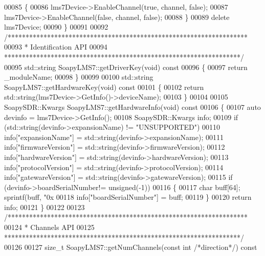 \begin{DoxyCode}
{{{{00085     \{
00086         lms7Device->EnableChannel(\textcolor{keyword}{true}, channel, \textcolor{keyword}{false});   
00087         lms7Device->EnableChannel(\textcolor{keyword}{false}, channel, \textcolor{keyword}{false});
00088     \}
00089     \textcolor{keyword}{delete} lms7Device;
00090 \}
00091 
00092 \textcolor{comment}{/*******************************************************************}
00093 \textcolor{comment}{ * Identification API}
00094 \textcolor{comment}{ ******************************************************************/}
00095 std::string SoapyLMS7::getDriverKey(\textcolor{keywordtype}{void})\textcolor{keyword}{ const}
00096 \textcolor{keyword}{}\{
00097     \textcolor{keywordflow}{return} _moduleName;
00098 \}
00099 
00100 std::string SoapyLMS7::getHardwareKey(\textcolor{keywordtype}{void})\textcolor{keyword}{ const}
00101 \textcolor{keyword}{}\{
00102     \textcolor{keywordflow}{return} std::string(lms7Device->GetInfo()->deviceName);
00103 \}
00104 
00105 SoapySDR::Kwargs SoapyLMS7::getHardwareInfo(\textcolor{keywordtype}{void})\textcolor{keyword}{ const}
00106 \textcolor{keyword}{}\{
00107     \textcolor{keyword}{auto} devinfo = lms7Device->GetInfo();
00108     SoapySDR::Kwargs info;
00109     \textcolor{keywordflow}{if} (std::string(devinfo->expansionName) != \textcolor{stringliteral}{"UNSUPPORTED"})
00110         info[\textcolor{stringliteral}{"expansionName"}] = std::string(devinfo->expansionName);
00111     info[\textcolor{stringliteral}{"firmwareVersion"}] = std::string(devinfo->firmwareVersion);
00112     info[\textcolor{stringliteral}{"hardwareVersion"}] = std::string(devinfo->hardwareVersion);
00113     info[\textcolor{stringliteral}{"protocolVersion"}] = std::string(devinfo->protocolVersion);
00114     info[\textcolor{stringliteral}{"gatewareVersion"}] = std::string(devinfo->gatewareVersion);
00115     \textcolor{keywordflow}{if} (devinfo->boardSerialNumber!= \textcolor{keywordtype}{unsigned}(-1))
00116     \{
00117         \textcolor{keywordtype}{char} buff[64]; sprintf(buff, \textcolor{stringliteral}{"0x%
00118         info[\textcolor{stringliteral}{"boardSerialNumber"}] = buff;
00119     \}
00120     \textcolor{keywordflow}{return} info;
00121 \}
00122 
00123 \textcolor{comment}{/*******************************************************************}
00124 \textcolor{comment}{ * Channels API}
00125 \textcolor{comment}{ ******************************************************************/}
00126 
00127 \textcolor{keywordtype}{size\_t} SoapyLMS7::getNumChannels(\textcolor{keyword}{const} \textcolor{keywordtype}{int} \textcolor{comment}{/*direction*/})\textcolor{keyword}{ const}
}}}}}
\end{DoxyCode}
